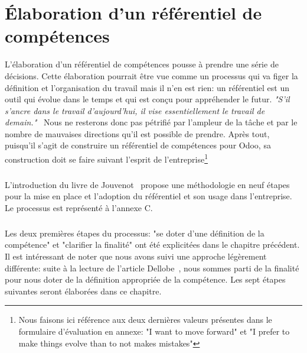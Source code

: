 \chapter{Élaboration d'un référentiel de compétences}
L'élaboration d'un référentiel de compétences pousse à prendre une série de décisions. Cette élaboration pourrait être vue comme un processus qui va figer la définition et l'organisation du travail mais il n'en est rien: un référentiel est un outil qui évolue dans le temps et qui est conçu pour appréhender le futur. \textit{"S'il s'ancre dans le travail d'aujourd'hui, il vise essentiellement le travail de demain."}~\citep[pp.19]{refcompetence} Nous ne resterons donc pas pétrifié par l'ampleur de la tâche et par le nombre de mauvaises directions qu'il est possible de prendre. Après tout, puisqu'il s'agit de construire un référentiel de compétences pour Odoo, sa construction doit se faire suivant l'esprit de l'entreprise\footnote{Nous faisons ici référence aux deux dernières valeurs présentes dans le formulaire d'évaluation en annexe: "I want to move forward" et "I prefer to make things evolve than to not makes mistakes"} 

\paragraph{}L'introduction du livre de Jouvenot~\citep{refcompetence} propose une méthodologie en neuf étapes pour la mise en place et l'adoption du référentiel et son usage dans l'entreprise. Le processus est représenté à l'annexe C. 

\paragraph{} Les deux premières étapes du processus: "se doter d'une définition de la compétence" et "clarifier la finalité" ont été explicitées dans le chapitre précédent. Il est intéressant de noter que nous avons suivi une approche légèrement différente: suite à la lecture de l'article Dellobe~\citep{delobbe}, nous sommes parti de la finalité pour nous doter de la définition appropriée de la compétence. Les sept étapes suivantes seront élaborées dans ce chapitre.

